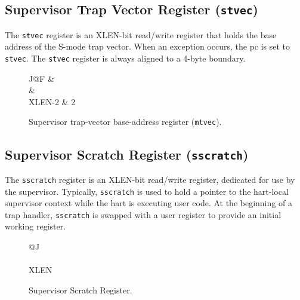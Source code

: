 \subsection{Supervisor Trap Vector Register
(\texttt{stvec})}\label{supervisor-trap-vector-register-stvec}

The \texttt{stvec} register is an XLEN-bit read/write register that holds the
base address of the S-mode trap vector. When an exception occurs, the pc
is set to \texttt{stvec}. The \texttt{stvec} register is always aligned to a 4-byte
boundary.

\ifdefined\MARKDOWN
\else

\begin{figure*}[htb]
	{\footnotesize
		\begin{center}
			\begin{tabular}{J@{}F}
				 &
				 \\
				\hline
				 &
				 \\
				\hline
				XLEN-2 & 2 \\
			\end{tabular}
		\end{center}
	}
	\vspace{-0.1in}
	\caption{Supervisor trap-vector base-address register (\texttt{mtvec}).}
	\label{fig:stvecreg}
\end{figure*}

\fi

\subsection{Supervisor Scratch Register (\texttt{sscratch})
}\label{supervisor-scratch-register-sscratch}

The \texttt{sscratch} register is an XLEN-bit read/write register, dedicated for
use by the supervisor. Typically, \texttt{sscratch} is used to hold a pointer to
the hart-local supervisor context while the hart is executing user code.
At the beginning of a trap handler, \texttt{sscratch} is swapped with a user
register to provide an initial working register.

\ifdefined\MARKDOWN
\else

\begin{figure}[htb]
	{\footnotesize
		\begin{center}
			\begin{tabular}{@{}J}
				\instbitrange{XLEN-1}{0} \\
				\hline
				\multicolumn{1}{|c|}{\texttt{sscratch}} \\
				\hline
				XLEN \\
			\end{tabular}
		\end{center}
	}
	\vspace{-0.1in}
	\caption{Supervisor Scratch Register.}
	\label{fig:sscratchreg}
\end{figure}

